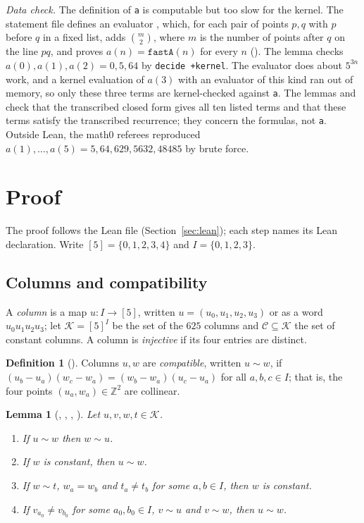 \documentclass[11pt]{amsart}
\theoremstyle{plain}
\newtheorem{lemma}[theorem]{Lemma}
\theoremstyle{definition}
\newtheorem{definition}[theorem]{Definition}
\newcommand{\Z}{\mathbb{Z}}
\newcommand{\cK}{\mathcal{K}}
\newcommand{\cC}{\mathcal{C}}
\begin{document}
\emph{Data check.} The definition of \texttt{a} is computable but too slow for the kernel. The statement file defines an evaluator , which, for each pair of points $p,q$ with $p$ before $q$ in a fixed list, adds $\binom m2$, where $m$ is the number of points after $q$ on the line $pq$, and proves $a(n)=\mathtt{fastA}(n)$ for every $n$ (). The lemma  checks $a(0),a(1),a(2)=0,5,64$ by \texttt{decide +kernel}. The evaluator does about $5^{3n}$ work, and a kernel evaluation of $a(3)$ with an evaluator of this kind ran out of memory, so only these three terms are kernel-checked against \texttt{a}. The lemmas  and  check that the transcribed closed form gives all ten listed terms and that these terms satisfy the transcribed recurrence; they concern the formulas, not \texttt{a}. Outside Lean, the math0 referees reproduced $a(1),\dots,a(5)=5,64,629,5632,48485$ by brute force.

\section{Proof}\label{sec:proof}

The proof follows the Lean file (Section~\ref{sec:lean}); each step names its Lean declaration. Write $[5]=\{0,1,2,3,4\}$ and $I=\{0,1,2,3\}$.

\subsection{Columns and compatibility}
A \emph{column} is a map $u\colon I\to[5]$, written $u=(u_0,u_1,u_2,u_3)$ or as a word $u_0u_1u_2u_3$; let $\cK=[5]^I$ be the set of the $625$ columns and $\cC\subseteq\cK$ the set of constant columns. A column is \emph{injective} if its four entries are distinct.

\begin{definition}[]
Columns $u,w$ are \emph{compatible}, written $u\sim w$, if $(u_b-u_a)(w_c-w_a)=(w_b-w_a)(u_c-u_a)$ for all $a,b,c\in I$; that is, the four points $(u_a,w_a)\in\Z^2$ are collinear.
\end{definition}

\begin{lemma}[, , , ]\label{lem:alg}
Let $u,v,w,t\in\cK$.
\begin{enumerate}
\item If $u\sim w$ then $w\sim u$.
\item If $w$ is constant, then $u\sim w$.
\item If $w\sim t$, $w_a=w_b$ and $t_a\ne t_b$ for some $a,b\in I$, then $w$ is constant.
\item If $v_{a_0}\ne v_{b_0}$ for some $a_0,b_0\in I$, $v\sim u$ and $v\sim w$, then $u\sim w$.
\end{enumerate}
\end{lemma}
\end{document}
